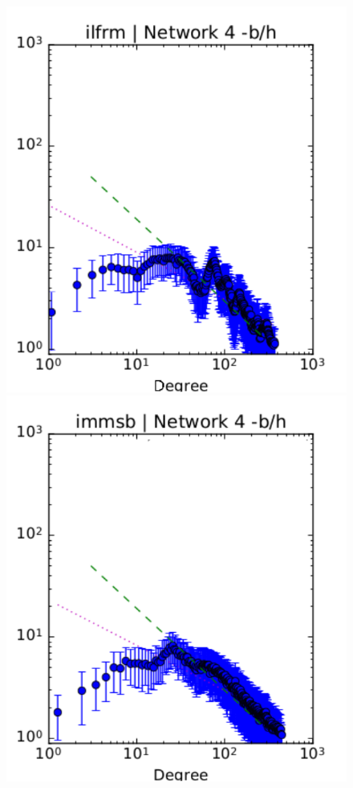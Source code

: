 \begin{figure}[h]
	\endminipage
	\vspace{-0.4cm}
	\includegraphics[scale=0.4]{img/ilfrm_g4_d}
	\endminipage
	\includegraphics[scale=0.4]{img/immsb_g4_d}
	\endminipage
	

\end{figure}
